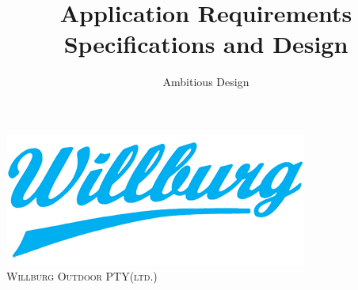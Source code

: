 \documentclass[a4paper,12pt]{report}
\author{Ambitious Design}
\title{ Application Requirements Specifications and Design}
\begin{document}
\setlength{\parskip}{6pt}

\begin{titlepage}

\begin{center}

\includegraphics{../Images/willburg.png}\\
\textsc{\LARGE Willburg Outdoor PTY(ltd.)}\\[1.5cm]


\end{center}
\end{titlepage}
\end{document}

